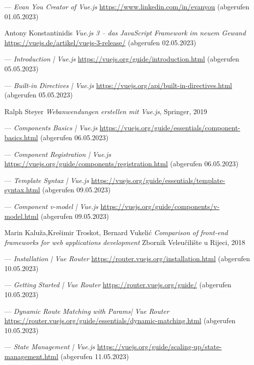 \begin{thebibliography}{99}
	---
	\emph{Evan You Creator of Vue.js}
	\url{https://www.linkedin.com/in/evanyou}
	(abgerufen 01.05.2023)

	Antony Konstantinidis
	\emph{Vue.js 3 – das JavaScript Framework im neuem Gewand}
	\url{https://vuejs.de/artikel/vuejs-3-release/}
	(abgerufen 02.05.2023)

	---
	\emph{Introduction | Vue.js}
	\url{https://vuejs.org/guide/introduction.html}
	(abgerufen 05.05.2023)

	---
	\emph{Built-in Directives | Vue.js}
	\url{https://vuejs.org/api/built-in-directives.html}
	(abgerufen 05.05.2023)

	Ralph Steyer
	\emph{Webanwendungen erstellen mit Vue.js},
	Springer,
	2019

	---
	\emph{Components Basics | Vue.js}
	\url{https://vuejs.org/guide/essentials/component-basics.html}
	(abgerufen 06.05.2023)

	---
	\emph{Component Registration | Vue.js}
	\url{https://vuejs.org/guide/components/registration.html}
	(abgerufen 06.05.2023)

	---
	\emph{Template Syntax | Vue.js}
	\url{https://vuejs.org/guide/essentials/template-syntax.html}
	(abgerufen 09.05.2023)

	---
	\emph{Component v-model | Vue.js}
	\url{https://vuejs.org/guide/components/v-model.html}
	(abgerufen 09.05.2023)

	Marin Kalu{\v{z}}a,Kre{\v{s}}imir Troskot, Bernard Vukeli{\'c}
	\emph{Comparison of front-end frameworks for web applications development}
	Zbornik Veleu{\v{c}}ili{\v{s}}te u Rijeci,
	2018

	---
	\emph{Installation | Vue Router}
	\url{https://router.vuejs.org/installation.html}
	(abgerufen 10.05.2023)

	---
	\emph{Getting Started | Vue Router}
	\url{https://router.vuejs.org/guide/}
	(abgerufen 10.05.2023)

	---
	\emph{Dynamic Route Matching with Params| Vue Router}
	\url{https://router.vuejs.org/guide/essentials/dynamic-matching.html}
	(abgerufen 10.05.2023)

	---
	\emph{State Management | Vue.js}
	\url{https://vuejs.org/guide/scaling-up/state-management.html}
	(abgerufen 11.05.2023)


\end{thebibliography}
